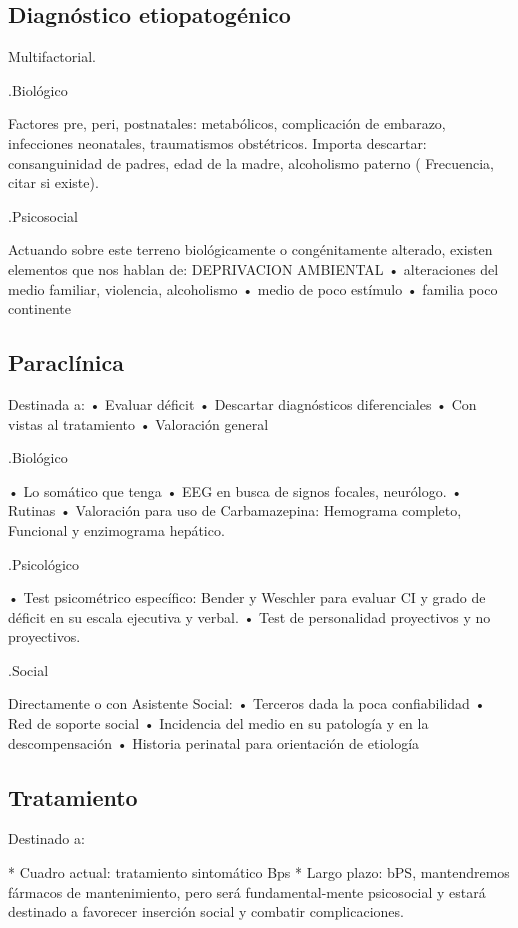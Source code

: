 \documentclass{scrbook}
\begin{document}
\subsection*{Diagnóstico etiopatogénico}
Multifactorial.

.Biológico

Factores pre, peri, postnatales: metabólicos, complicación de embarazo, infecciones neonatales, traumatismos obstétricos. Importa descartar: consanguinidad de padres, edad de la madre, alcoholismo paterno ( Frecuencia, citar si existe).

.Psicosocial

Actuando sobre este terreno biológicamente o congénitamente alterado, existen elementos que nos hablan de: DEPRIVACION AMBIENTAL • alteraciones del medio familiar, violencia, alcoholismo • medio de poco estímulo • familia poco continente

\subsection*{Paraclínica}

Destinada a: • Evaluar déficit • Descartar diagnósticos diferenciales • Con vistas al tratamiento • Valoración general

.Biológico

• Lo somático que tenga • EEG en busca de signos focales, neurólogo. • Rutinas • Valoración para uso de Carbamazepina: Hemograma completo, Funcional y enzimograma hepático.

.Psicológico

• Test psicométrico específico: Bender y Weschler para evaluar CI y grado de déficit en su escala ejecutiva y verbal. • Test de personalidad proyectivos y no proyectivos.

.Social

Directamente o con Asistente Social: • Terceros dada la poca confiabilidad • Red de soporte social • Incidencia del medio en su patología y en la descompensación • Historia perinatal para orientación de etiología

\subsection*{Tratamiento}

Destinado a:

* Cuadro actual: tratamiento sintomático Bps
* Largo plazo: bPS, mantendremos fármacos de mantenimiento, pero será fundamental-mente psicosocial y estará destinado a favorecer inserción social y combatir complicaciones.
\end{document}
